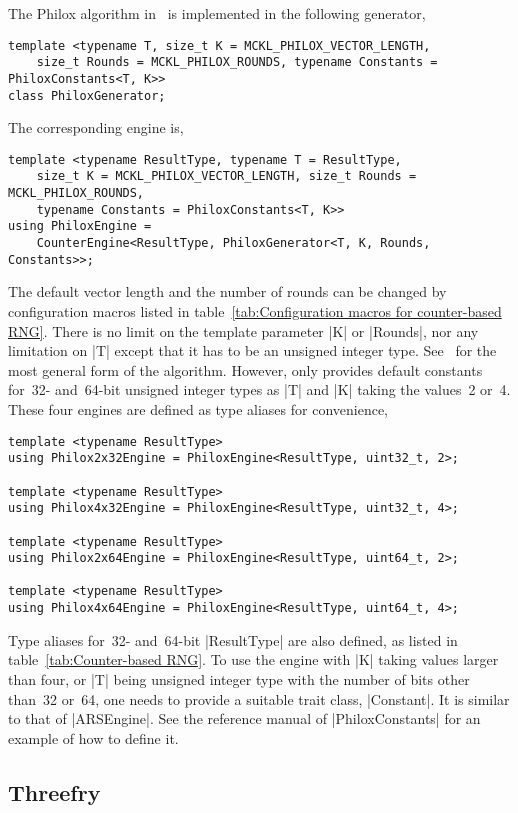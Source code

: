 The Philox algorithm in~\cite{Salmon:2011um} is implemented in the following
generator,
\begin{verbatim}
template <typename T, size_t K = MCKL_PHILOX_VECTOR_LENGTH,
    size_t Rounds = MCKL_PHILOX_ROUNDS, typename Constants = PhiloxConstants<T, K>>
class PhiloxGenerator;
\end{verbatim}
The corresponding \rng engine is,
\begin{verbatim}
template <typename ResultType, typename T = ResultType,
    size_t K = MCKL_PHILOX_VECTOR_LENGTH, size_t Rounds = MCKL_PHILOX_ROUNDS,
    typename Constants = PhiloxConstants<T, K>>
using PhiloxEngine =
    CounterEngine<ResultType, PhiloxGenerator<T, K, Rounds, Constants>>;
\end{verbatim}
The default vector length and the number of rounds can be changed by
configuration macros listed in table~\ref{tab:Configuration macros for
counter-based RNG}. There is no limit on the template parameter |K| or
|Rounds|, nor any limitation on |T| except that it has to be an unsigned
integer type. See~\cite{Salmon:2011um} for the most general form of the
algorithm. However, \mckl only provides default constants for~32- and~64-bit
unsigned integer types as |T| and |K| taking the values~2 or~4. These four
engines are defined as type aliases for convenience,
\begin{verbatim}
template <typename ResultType>
using Philox2x32Engine = PhiloxEngine<ResultType, uint32_t, 2>;

template <typename ResultType>
using Philox4x32Engine = PhiloxEngine<ResultType, uint32_t, 4>;

template <typename ResultType>
using Philox2x64Engine = PhiloxEngine<ResultType, uint64_t, 2>;

template <typename ResultType>
using Philox4x64Engine = PhiloxEngine<ResultType, uint64_t, 4>;
\end{verbatim}
Type aliases for~32- and~64-bit |ResultType| are also defined, as listed in
table~\ref{tab:Counter-based RNG}. To use the engine with |K| taking values
larger than four, or |T| being unsigned integer type with the number of bits
other than~32 or~64, one needs to provide a suitable trait class, |Constant|.
It is similar to that of |ARSEngine|. See the reference manual of
|PhiloxConstants| for an example of how to define it.

\subsection{Threefry}
\label{sub:Threefry}

